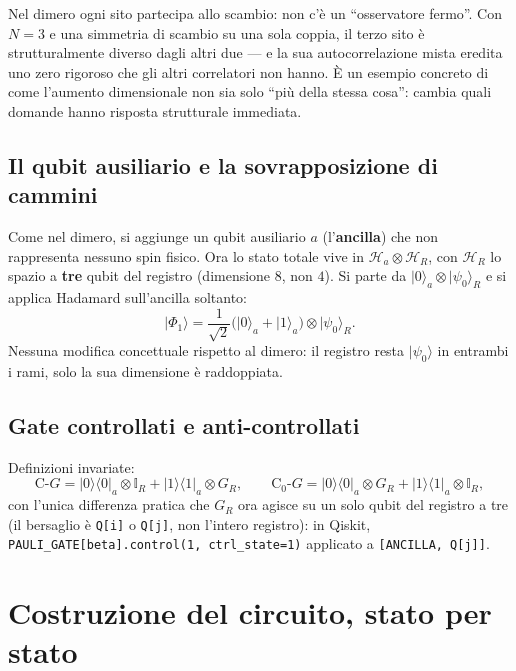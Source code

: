 \documentclass[11pt,a4paper]{article}
\newcommand{\ket}[1]{\lvert #1\rangle}
\newcommand{\bra}[1]{\langle #1\rvert}
\begin{document}
\begin{noveltybox}[Perché questo è specifico di $N=3$]
Nel dimero ogni sito partecipa allo scambio: non c'è un ``osservatore fermo''. Con $N=3$ e una
simmetria di scambio su una sola coppia, il terzo sito è strutturalmente diverso dagli altri due
--- e la sua autocorrelazione mista eredita uno zero rigoroso che gli altri correlatori non hanno.
È un esempio concreto di come l'aumento dimensionale non sia solo ``più della stessa cosa'': cambia
quali domande hanno risposta strutturale immediata.
\end{noveltybox}

\subsection{Il qubit ausiliario e la sovrapposizione di cammini}

Come nel dimero, si aggiunge un qubit ausiliario $a$ (l'\textbf{ancilla}) che non rappresenta
nessuno spin fisico. Ora lo stato totale vive in $\mathcal H_a\otimes\mathcal H_R$, con
$\mathcal H_R$ lo spazio a \textbf{tre} qubit del registro (dimensione $8$, non $4$). Si parte da
$\ket0_a\otimes\ket{\psi_0}_R$ e si applica Hadamard sull'ancilla soltanto:
\begin{equation}
\ket{\Phi_1}=\frac{1}{\sqrt2}\Big(\ket0_a+\ket1_a\Big)\otimes\ket{\psi_0}_R.
\end{equation}
Nessuna modifica concettuale rispetto al dimero: il registro resta $\ket{\psi_0}$ in entrambi i
rami, solo la sua dimensione è raddoppiata.

\subsection{Gate controllati e anti-controllati}

Definizioni invariate:
\begin{equation}
\mathrm{C}\text{-}G = \ket0\!\bra0_a\otimes\mathbb{I}_R + \ket1\!\bra1_a\otimes G_R,
\qquad
\mathrm{C}_0\text{-}G = \ket0\!\bra0_a\otimes G_R + \ket1\!\bra1_a\otimes\mathbb{I}_R,
\label{eq:ctrl}
\end{equation}
con l'unica differenza pratica che $G_R$ ora agisce su un solo qubit del registro a tre (il
bersaglio è \texttt{Q[i]} o \texttt{Q[j]}, non l'intero registro): in Qiskit,
\texttt{PAULI\_GATE[beta].control(1, ctrl\_state=1)} applicato a \texttt{[ANCILLA, Q[j]]}.

\section{Costruzione del circuito, stato per stato}
\end{document}
